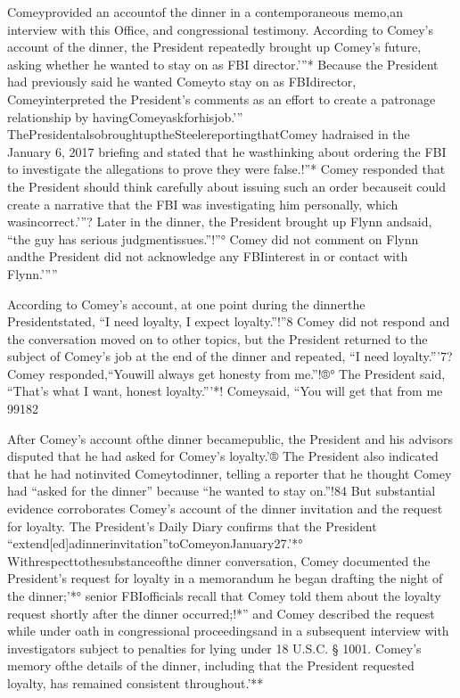 Comeyprovided an accountof the dinner in a contemporaneous memo,an interview with this Office, and congressional testimony.
According to Comey’s account of the dinner, the President repeatedly brought up Comey’s future, asking whether he wanted to stay on as FBI director.'”*
Because the President had previously said he wanted Comeyto stay on as FBIdirector, Comeyinterpreted the President’s comments as an effort to create a patronage relationship by havingComeyaskforhisjob.'”
ThePresidentalsobroughtuptheSteelereportingthatComey hadraised in the January 6, 2017 briefing and stated that he wasthinking about ordering the FBI to investigate the allegations to prove they were false.!”*
Comey responded that the President should think carefully about issuing such an order becauseit could create a narrative that the FBI was investigating him personally, which wasincorrect.'”?
Later in the dinner, the President brought up Flynn andsaid, “the guy has serious judgmentissues.”!”°
Comey did not comment on Flynn andthe President did not acknowledge any FBIinterest in or contact with Flynn.'””

According to Comey’s account, at one point during the dinnerthe Presidentstated, “I need loyalty, I expect loyalty.”!”8
Comey did not respond and the conversation moved on to other topics, but the President returned to the subject of Comey’s job at the end of the dinner and repeated, “I need loyalty.”'7?
Comey responded,“Youwill always get honesty from me.”!®°
The President said, “That’s what I want, honest loyalty.”'*!
Comeysaid, “You will get that from me 99182

After Comey’s account ofthe dinner becamepublic, the President and his advisors disputed that he had asked for Comey’s loyalty.'®
The President also indicated that he had notinvited Comeytodinner, telling a reporter that he thought Comey had “asked for the dinner” because “he wanted to stay on.”!84
But substantial evidence corroborates Comey’s account of the dinner invitation and the request for loyalty.
The President’s Daily Diary confirms that the President “extend[ed]adinnerinvitation”toComeyonJanuary27.'*°
Withrespecttothesubstanceofthe dinner conversation, Comey documented the President’s request for loyalty in a memorandum he began drafting the night of the dinner;'*°
senior FBIofficials recall that Comey told them about the loyalty request shortly after the dinner occurred;!*”
and Comey described the request while under oath in congressional proceedingsand in a subsequent interview with investigators subject to penalties for lying under 18 U.S.C. § 1001.
Comey’s memory ofthe details of the dinner, including that the President requested loyalty, has remained consistent throughout.'**

